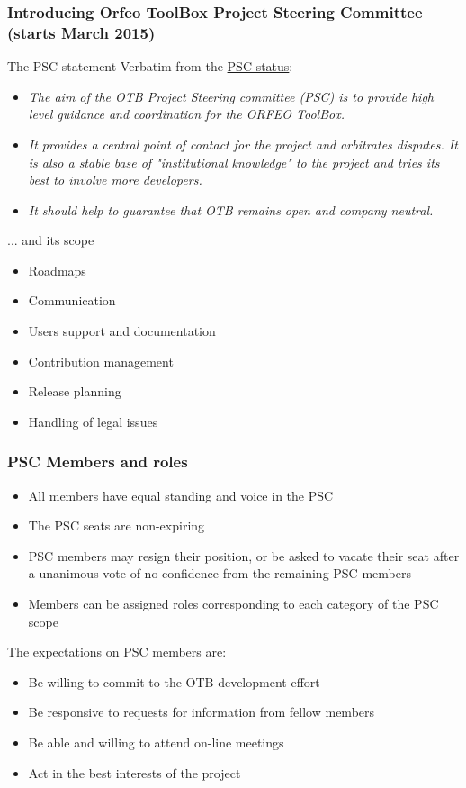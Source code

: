 \documentclass[8pt]{beamer}
\begin{document}
\begin{frame}
\frametitle{Introducing Orfeo ToolBox Project Steering Committee (starts March 2015)}

\begin{block}{The PSC statement}
Verbatim from the \href{http://wiki.orfeo-toolbox.org/index.php/Project_Steering_Committee}{PSC status}:
\begin{itemize}
\item \textit{The aim of the OTB Project Steering committee (PSC) is to provide high level guidance and coordination for the ORFEO ToolBox.}
\item \textit{It provides a central point of contact for the project and arbitrates disputes. It is also a stable base of "institutional knowledge" to the project and tries its best to involve more developers.}
\item \textit{It should help to guarantee that OTB remains open and company neutral.}
\end{itemize}
\end{block}

\begin{block}{... and its scope}
\begin{itemize}
\item Roadmaps
\item Communication
\item Users support and documentation
\item Contribution management
\item Release planning
\item Handling of legal issues
\end{itemize}

\end{block}

\end{frame}

\begin{frame}
\frametitle{PSC Members and roles}

\begin{itemize}
\item All members have equal standing and voice in the PSC
\item The PSC seats are non-expiring
\item PSC members may resign their position, or be asked to vacate their seat after a unanimous vote of no confidence from the remaining PSC members
\item Members can be assigned roles corresponding to each category of the PSC scope
\end{itemize}

The expectations on PSC members are:
\begin{itemize}
\item Be willing to commit to the OTB development effort
\item Be responsive to requests for information from fellow members
\item Be able and willing to attend on-line meetings
\item Act in the best interests of the project 
\end{itemize}
\end{frame}
\end{document}
